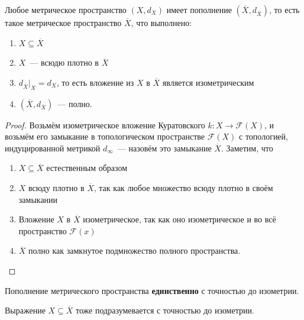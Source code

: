 \documentclass[11pt]{article}
\begin{document}
    \begin{Theorem}
    Любое метрическое пространство $(X, d_X)$ имеет пополнение $(\overline{X}, d_{\overline{X}})$, то есть такое метрическое пространство $\overline{X}$, что выполнено:
    \begin{enumerate}
        \item $X \subseteq \overline{X}$
        \item $X$~--- всюдю плотно в $\overline{X}$
        \item $d_{\overline{X}}|_X = d_X$, то есть вложение из $X$ в $\overline{X}$ является изометрическим
        \vspace{3pt}
        \item $(\overline{X}, d_{\overline{X}})$~--- полно.
    \end{enumerate}
    \end{Theorem}
    \begin{proof}
    Возьмём изометрическое вложение Куратовского $k: X \to \mathcal{F}(X)$, и возьмём его замыкание в топологическом пространстве $\mathcal{F}(X)$ с топологией, индуцированной метрикой $d_{\infty}$~--- назовём это замыкание $\overline{X}$. Заметим, что
    \begin{enumerate}
        \item $X \subseteq \overline{X}$ естественным образом
        \item $X$ всюду плотно в $\overline{X}$, так как любое множество всюду плотно в своём замыкании
        \item Вложение $X$ в $\overline{X}$ изометрическое, так как оно изометрическое и во всё пространство $\mathcal{F}(x)$
        \item $\overline{X}$ полно как замкнутое подмножество полного пространства.
    \end{enumerate}
    \end{proof}


    \begin{remark}
    Пополнение метрического пространства \textbf{единственно} с точностью до изометрии.
    \end{remark}

    \begin{remark}
    Выражение $X \subseteq \overline{X}$ тоже подразумевается с точностью до изометрии.
    \end{remark}
\end{document}
